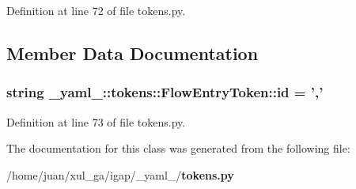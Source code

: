 Definition at line 72 of file tokens.py.

\subsection{Member Data Documentation}
\subsubsection{\setlength{\rightskip}{0pt plus 5cm}string {\bf \_\-yaml\_\-::tokens::FlowEntryToken::id} = ','\hspace{0.3cm}{\tt  [static]}}\label{class__yaml___1_1tokens_1_1FlowEntryToken_b468f7d84ede14da52f0808ea6477286}




Definition at line 73 of file tokens.py.

The documentation for this class was generated from the following file:\begin{CompactItemize}
\item 
/home/juan/xul\_\-ga/igap/\_\-yaml\_\-/{\bf tokens.py}\end{CompactItemize}
